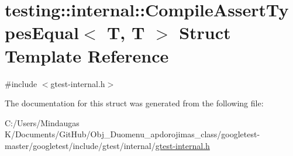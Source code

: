 \hypertarget{structtesting_1_1internal_1_1_compile_assert_types_equal_3_01_t_00_01_t_01_4}{}\section{testing\+::internal\+::Compile\+Assert\+Types\+Equal$<$ T, T $>$ Struct Template Reference}
\label{structtesting_1_1internal_1_1_compile_assert_types_equal_3_01_t_00_01_t_01_4}


{\ttfamily \#include $<$gtest-\/internal.\+h$>$}



The documentation for this struct was generated from the following file\+:\begin{DoxyCompactItemize}
\item 
C\+:/\+Users/\+Mindaugas K/\+Documents/\+Git\+Hub/\+Obj\+\_\+\+Duomenu\+\_\+apdorojimas\+\_\+class/googletest-\/master/googletest/include/gtest/internal/\mbox{\hyperlink{googletest-master_2googletest_2include_2gtest_2internal_2gtest-internal_8h}{gtest-\/internal.\+h}}\end{DoxyCompactItemize}
